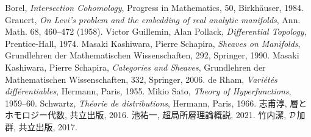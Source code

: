 \begin{thebibliography}{20} 
     Borel, 
        \textit{Intersection Cohomology}, 
        Progress in Mathematics, 50, Birkh\"auser, 1984.
     Grauert, 
        \textit{On Levi's problem and the embedding of real analytic manifolds}, 
        Ann. Math. 68, 460--472 (1958).
     Victor Guillemin, Alan Pollack, 
        \textit{Differential Topology}, 
        Prentice-Hall, 1974.
     Masaki Kashiwara, Pierre Schapira, 
        \textit{Sheaves on Manifolds}, 
        Grundlehren der Mathematischen Wissenschaften, 292, Springer, 1990.
     Masaki Kashiwara, Pierre Schapira, 
        \textit{Categories and Sheaves}, 
        Grundlehren der Mathematischen Wissenschaften, 332, Springer, 2006.
     de Rham, 
        \textit{Vari\'et\'es diff\'erentiables}, 
        Hermann, Paris, 1955.
     Mikio Sato, 
        \textit{Theory of Hyperfunctions}, 
        1959--60.
     Schwartz, 
        \textit{Th\'eorie de distributions}, 
        Hermann, Paris, 1966.
     志甫淳, 層とホモロジー代数, 共立出版, 2016.
     池祐一, 超局所層理論概説, 2021.
     竹内潔, \(\mathcal{D}\)加群, 共立出版, 2017.
\end{thebibliography}




